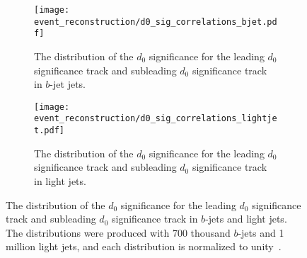 \begin{figure}[htbp]
 \centering
 \begin{subfigure}[t]{0.48\textwidth}
  \centering
  \texttt{[image: event\_reconstruction/d0\_sig\_correlations\_bjet.pdf]}
  \caption[The distribution of the $d_{0}$ significance for the leading $d_{0}$ significance track and subleading $d_{0}$ significance track in $b$-jet jets.]{%
   The distribution of the $d_{0}$ significance for the leading $d_{0}$ significance track and subleading $d_{0}$ significance track in $b$-jet jets.}
  \label{fig:d0_sig_correlations_bjet}
 \end{subfigure}%
 \quad
 \begin{subfigure}[t]{0.48\textwidth}
  \centering
  \texttt{[image: event\_reconstruction/d0\_sig\_correlations\_lightjet.pdf]}
  \caption[The distribution of the $d_{0}$ significance for the leading $d_{0}$ significance track and subleading $d_{0}$ significance track in light jets.]{%
   The distribution of the $d_{0}$ significance for the leading $d_{0}$ significance track and subleading $d_{0}$ significance track in light jets.}
  \label{fig:d0_sig_correlations_lightjet}
 \end{subfigure}%
 \caption[The distribution of the $d_{0}$ significance for the leading $d_{0}$ significance track and subleading $d_{0}$ significance track in $b$-jets and light jets.]{%
  The distribution of the $d_{0}$ significance for the leading $d_{0}$ significance track and subleading $d_{0}$ significance track in $b$-jets and light jets.
  The distributions were produced with 700 thousand $b$-jets and 1 million light jets, and each distribution is normalized to unity~\cite{ATL-PHYS-PUB-2017-003}.}
 \label{fig:RNNIP_track_significance}
\end{figure}

